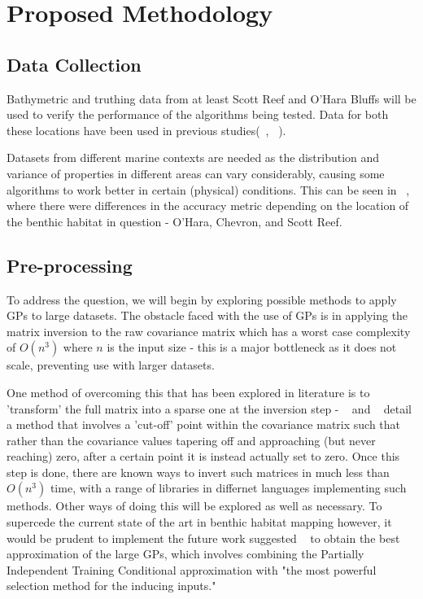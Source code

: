\documentclass[12pt]{article}
\begin{document}
\section{Proposed Methodology}
\subsection{Data Collection}
Bathymetric and truthing data from at least Scott Reef and O'Hara Bluffs will be used to verify the performance of the algorithms being tested. Data for both these locations have been used in previous studies(~\citet{bender12}, ~\citet{ahsan11}).

Datasets from different marine contexts are needed as the distribution and variance of properties in different areas can vary considerably, causing some algorithms to work better in certain (physical) conditions. This can be seen in ~\citep{ahsan11}, where there were differences in the accuracy metric depending on the location of the benthic habitat in question - O'Hara, Chevron, and Scott Reef.

\subsection{Pre-processing} To address the question, we will begin by exploring possible methods to apply GPs to large datasets. The obstacle faced with the use of GPs is in applying the matrix inversion to the raw covariance matrix which has a worst case complexity of $O(n^{3})$ where $n$ is the input size - this is a major bottleneck as it does not scale, preventing use with larger datasets.

One method of overcoming this that has been explored in literature is to 'transform' the full matrix into a sparse one at the inversion step - ~\citep{melkumyan09} and ~\citep{furrer06} detail a method that involves a 'cut-off' point within the covariance matrix such that rather than the covariance values tapering off and approaching (but never reaching) zero, after a certain point it is instead actually set to zero. Once this step is done, there are known ways to invert such matrices in much less than $O(n^{3})$ time, with a range of libraries in differnet languages implementing such methods. Other ways of doing this will be explored as well as necessary. To supercede the current state of the art in benthic habitat mapping however, it would be prudent to implement the future work suggested ~\citep{candela05} to obtain the best approximation of the large GPs, which involves combining the Partially Independent Training Conditional approximation with "the most powerful selection method for the inducing inputs." 
\end{document}
